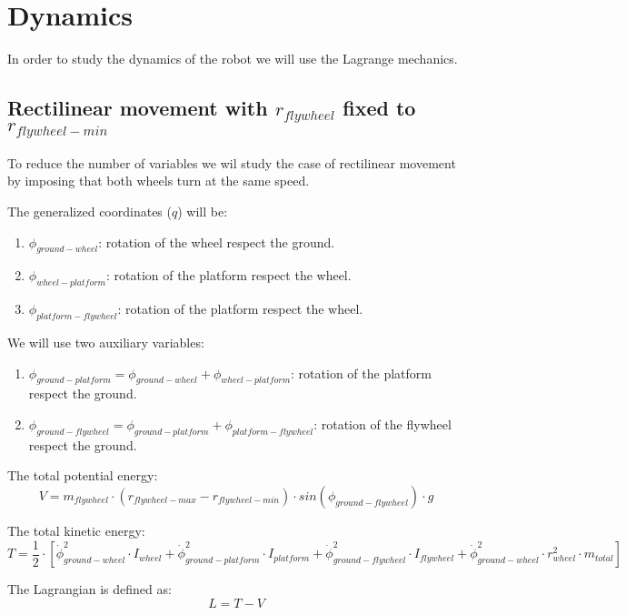 \section{Dynamics}

In order to study the dynamics of the robot we will use the Lagrange mechanics.

\subsection{Rectilinear movement with $r_{flywheel}$ fixed to $r_{flywheel-min}$}
To reduce the number of variables we wil study the case of rectilinear
movement by imposing that both wheels turn at the same speed.

The generalized coordinates ($q$) will be:
\begin{enumerate}
	\item $\phi_{ground-wheel}$: rotation of the wheel respect the ground.
	\item $\phi_{wheel-platform}$: rotation of the platform respect the wheel.
	\item $\phi_{platform-flywheel}$: rotation of the platform respect the wheel.
\end{enumerate}

We will use two auxiliary variables:
\begin{enumerate}
	\item $\phi_{ground-platform}=\phi_{ground-wheel}+\phi_{wheel-platform}$: rotation of the platform respect the ground.
	\item $\phi_{ground-flywheel}=\phi_{ground-platform}+\phi_{platform-flywheel}$: rotation of the flywheel respect the ground.
\end{enumerate}

The total potential energy:
\begin{equation}
	V = m_{flywheel}\cdot (r_{flywheel-max}-r_{flywheel-min}) \cdot sin(\phi_{ground-flywheel}) \cdot g	
\end{equation}


The total kinetic energy:
\begin{equation}
	T = \frac{1}{2}\cdot[\dot{\phi}_{ground-wheel}^2\cdot I_{wheel}
	+ \dot{\phi}_{ground-platform}^2 \cdot I_{platform}
	+ \dot{\phi}_{ground-flywheel}^2\cdot I_{flywheel}
	+ \dot{\phi}_{ground-wheel}^2\cdot r_{wheel}^2\cdot m_{total}]	
\end{equation}

The Lagrangian is defined as:
\begin{equation}
	L=T-V	
\end{equation}

